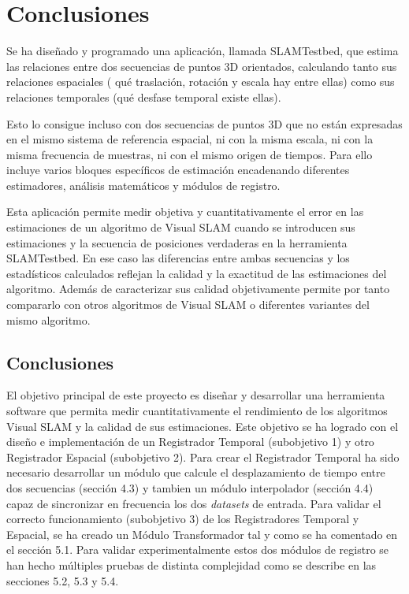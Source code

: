 \newpage

\chapter{Conclusiones} \label{cap:conclusiones}

Se ha diseñado y programado una aplicación, llamada SLAMTestbed, que estima las relaciones entre dos secuencias de puntos 3D orientados, calculando tanto sus relaciones espaciales ( qué traslación, rotación y escala hay entre ellas) como sus relaciones temporales (qué desfase temporal existe ellas).

Esto lo consigue incluso con dos secuencias de puntos 3D que no están expresadas en el mismo sistema de referencia espacial, ni con la misma escala, ni con la misma frecuencia de muestras, ni con el mismo origen de tiempos. Para ello incluye varios bloques específicos de estimación encadenando diferentes estimadores, análisis matemáticos y módulos de registro.

Esta aplicación permite medir objetiva y cuantitativamente el error en las estimaciones de un algoritmo de Visual SLAM cuando se introducen sus estimaciones y la secuencia de posiciones verdaderas en la herramienta SLAMTestbed. En ese caso las diferencias entre ambas secuencias y los estadísticos calculados reflejan la calidad y la exactitud de las estimaciones del algoritmo.
Además de caracterizar sus calidad objetivamente permite por tanto compararlo con otros algoritmos de Visual SLAM o diferentes variantes del mismo algoritmo.


\section{Conclusiones}

El objetivo principal de este proyecto es diseñar y desarrollar una herramienta software que permita medir cuantitativamente el rendimiento de los algoritmos Visual SLAM y la calidad de sus estimaciones.
Este objetivo se ha logrado con el diseño e implementación de un Registrador Temporal (subobjetivo 1) y otro Registrador Espacial (subobjetivo 2). 
Para crear el Registrador Temporal ha sido necesario desarrollar un módulo que calcule el desplazamiento de tiempo entre dos secuencias (sección 4.3) y tambien un módulo interpolador (sección 4.4) capaz de sincronizar en frecuencia los dos \textit{datasets} de entrada. Para validar el correcto funcionamiento (subobjetivo 3) de los Registradores Temporal y Espacial, se ha creado un Módulo Transformador tal y como se ha comentado en el sección 5.1.
Para validar experimentalmente estos dos módulos de registro se han hecho múltiples pruebas de distinta complejidad como se describe en las secciones 5.2, 5.3 y 5.4.


